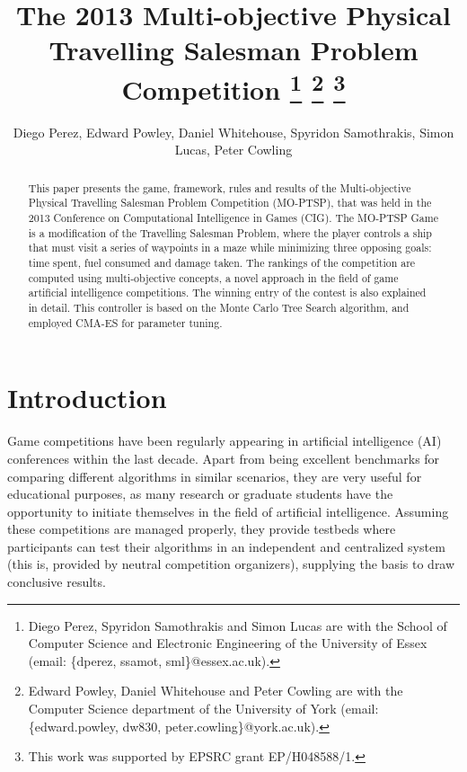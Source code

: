 \documentclass[conference]{IEEEtran}
\begin{document}
\title{The 2013 Multi-objective Physical Travelling Salesman Problem Competition \thanks{Diego Perez, Spyridon Samothrakis and Simon Lucas are with the School of Computer Science and Electronic Engineering of the University of Essex (email: \{dperez, ssamot, sml\}@essex.ac.uk).} \thanks{Edward Powley, Daniel Whitehouse and Peter Cowling are with the Computer Science department of the University of York (email:  \{edward.powley, dw830, peter.cowling\}@york.ac.uk).} \thanks{This work was supported by EPSRC grant EP/H048588/1.}}

\author{Diego Perez, Edward Powley, Daniel Whitehouse, Spyridon Samothrakis, Simon Lucas, Peter Cowling}


\maketitle

\begin{abstract}
This paper presents the game, framework, rules and results of the Multi-objective Physical Travelling Salesman Problem Competition (MO-PTSP), that was held in the 2013 Conference on Computational Intelligence in Games (CIG). The MO-PTSP Game is a modification of the Travelling Salesman Problem, where the player controls a ship that must visit a series of waypoints in a maze while minimizing three opposing goals: time spent, fuel consumed and damage taken. The rankings of the competition are computed using multi-objective concepts, a novel approach in the field of game artificial intelligence competitions. The winning entry of the contest is also explained in detail. This controller is based on the Monte Carlo Tree Search algorithm, and employed CMA-ES for parameter tuning. 
\end{abstract}


\section{Introduction}

Game competitions have been regularly appearing in artificial intelligence (AI) conferences within the last decade. Apart from being excellent benchmarks for comparing different algorithms in similar scenarios, they are very useful for educational purposes, as many research or graduate students have the opportunity to initiate themselves in the field of artificial intelligence. Assuming these competitions are managed properly, they provide testbeds where participants can test their algorithms in an independent and centralized system (this is, provided by neutral competition organizers), supplying the basis to draw conclusive results.
\end{document}

